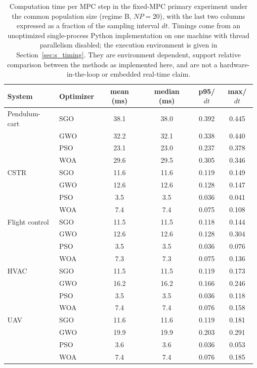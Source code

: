 \begin{table}[htbp]
\centering
\small
\caption{Computation time per MPC step in the fixed-MPC primary experiment under the common population size (regime B, $NP=20$), with the last two columns expressed as a fraction of the sampling interval $dt$. Timings come from an unoptimized single-process Python implementation on one machine with thread parallelism disabled; the execution environment is given in Section~\ref{sec:s_timing}. They are environment dependent, support relative comparison between the methods as implemented here, and are not a hardware-in-the-loop or embedded real-time claim.}
\label{tab:timing}
\begin{tabular}{@{}llcccc@{}}
\toprule
System & Optimizer & mean (ms) & median (ms) & p95/$dt$ & max/$dt$ \\
\midrule
Pendulum-cart & SGO & 38.1 & 38.0 & 0.392 & 0.445 \\
 & GWO & 32.2 & 32.1 & 0.338 & 0.440 \\
 & PSO & 23.1 & 23.0 & 0.237 & 0.378 \\
 & WOA & 29.6 & 29.5 & 0.305 & 0.346 \\
\addlinespace
CSTR & SGO & 11.6 & 11.6 & 0.119 & 0.149 \\
 & GWO & 12.6 & 12.6 & 0.128 & 0.147 \\
 & PSO & 3.5 & 3.5 & 0.036 & 0.041 \\
 & WOA & 7.4 & 7.4 & 0.075 & 0.108 \\
\addlinespace
Flight control & SGO & 11.5 & 11.5 & 0.118 & 0.144 \\
 & GWO & 12.6 & 12.6 & 0.128 & 0.304 \\
 & PSO & 3.5 & 3.5 & 0.036 & 0.076 \\
 & WOA & 7.3 & 7.3 & 0.075 & 0.136 \\
\addlinespace
HVAC & SGO & 11.5 & 11.5 & 0.119 & 0.173 \\
 & GWO & 16.2 & 16.2 & 0.166 & 0.246 \\
 & PSO & 3.5 & 3.5 & 0.036 & 0.118 \\
 & WOA & 7.4 & 7.4 & 0.076 & 0.158 \\
\addlinespace
UAV & SGO & 11.6 & 11.6 & 0.119 & 0.181 \\
 & GWO & 19.9 & 19.9 & 0.203 & 0.291 \\
 & PSO & 3.6 & 3.6 & 0.036 & 0.053 \\
 & WOA & 7.4 & 7.4 & 0.076 & 0.185 \\
\bottomrule
\end{tabular}
\end{table}
